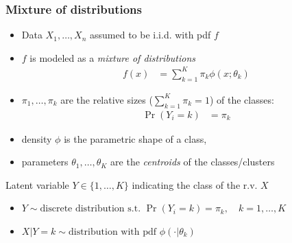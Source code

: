 \documentclass[compress, smaller, serif, 9pt]{beamer}
\begin{document}
\begin{frame}
   \frametitle{Mixture of distributions}
   \begin{itemize}
      \item Data $X_1,\ldots,X_n$ assumed to be i.i.d. with pdf $f$
      \item $f$ is modeled as a  {\em mixture of distributions}
      \begin{align*}
	f(x)&= \sum_{k=1}^K \pi_k \phi\left( x ; \theta_k \right)
      \end{align*}
      \item $\pi_1, \ldots, \pi_k$ are the relative sizes ($\sum_{k=1}^K \pi_k = 1$) of the classes:
       \begin{align*}
	\Pr\left(Y_i=k\right) &=  \pi_k
      \end{align*}
      \item density $\phi$ is the parametric shape of a class,
      \item parameters $\theta_1,\ldots,\theta_K$ are the {\em centroids}
      of the classes/clusters
 \end{itemize}
   \begin{block}{Latent variable}
   $Y \in\{1,\ldots,K\}$ indicating the class of the r.v. $X$
      \begin{itemize}
      \item $
   Y \sim \textrm{discrete distribution s.t. }   \Pr\left(Y_i=k\right) =  \pi_k, \quad k=1,\ldots,K
       $
        \item $
       X|Y=k \sim \textrm{distribution with pdf }  \phi\left( \cdot | \theta_k \right)
      $
      \end{itemize}
    \end{block}
\end{frame}
\end{document}
